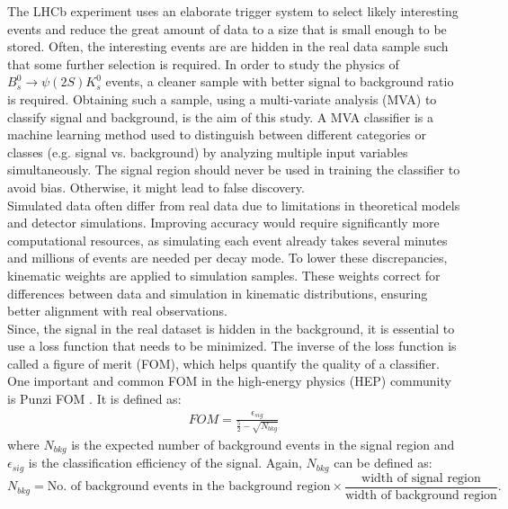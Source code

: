 The LHCb experiment uses an elaborate trigger system to select likely interesting events and
reduce the great amount of data to a size that is small enough to be stored. Often, the interesting events are are hidden in the real data sample
such that some further selection is required. In order to study the physics of $B_{s}^{0} \rightarrow \psi(2S)K_{s}^{0}$
events, a cleaner sample with
better signal to background ratio is required. Obtaining such a sample, using a multi-variate analysis (MVA)
to classify signal and background, is the aim of this study. A MVA classifier is a machine learning method used to distinguish between different categories or classes (e.g. signal vs. background) by analyzing multiple input variables simultaneously. The signal region should never be used in training the classifier to avoid bias. Otherwise, it might lead to false discovery.\\

Simulated data often differ from real data due to limitations in theoretical models and detector simulations. Improving accuracy would require significantly more computational resources, as simulating each event already takes several minutes and millions of events are needed per decay mode. To lower these discrepancies, kinematic weights are applied to simulation samples. These weights correct for differences between data and simulation in kinematic distributions, ensuring better alignment with real observations.\\

Since, the signal in the real dataset is hidden in the background, it is essential to use a loss function that needs to be minimized. The inverse of the loss function is called a figure of merit (FOM), which helps quantify the quality of a classifier. One important and common FOM in the high-energy physics (HEP) community is Punzi FOM \cite{punzi}. It is defined as:\\
\begin{align}
    FOM=\frac{\epsilon_{sig}}{\frac{5}{2}-\sqrt{N_{bkg}}}
\end{align}
where $N_{bkg}$ is the expected number of background events in the signal region and $\epsilon_{sig}$ is the classification efficiency of the signal. Again, $N_{bkg}$ can be defined as:\\
$$
    N_{bkg} = \text{No. of background events in the background region}\times\frac{\text{width of signal region}}{\text{width of background region}}.
$$


